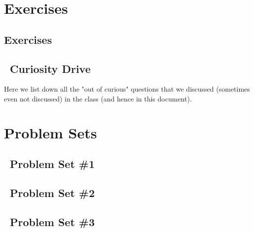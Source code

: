 \documentclass[11pt]{report}
\begin{document}
\chapter{Exercises}
\section{Exercises}
\setcounter{excount}{0}

\newpage

\section{~Curiosity Drive}
Here we list down all the "out of curious" questions that we discussed (sometimes even not discussed) in the class (and hence in this document).

\def\psetbackref{0}

\chapter{Problem Sets}

\section{~Problem Set \#1}
\begin{enumerate}[(1)]
\end{enumerate}

\newpage
\section{~Problem Set \#2}

\begin{enumerate}[(1)]
\end{enumerate}

\newpage
\section{~Problem Set \#3}

\begin{enumerate}[(1)]
\end{enumerate}
%
%



\end{document}
